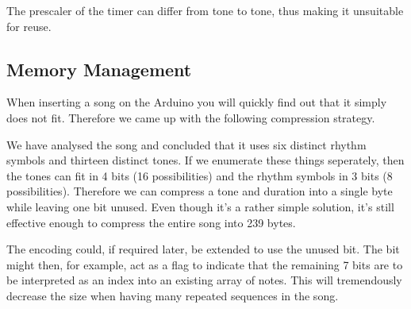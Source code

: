 The prescaler of the timer can differ from tone to tone, thus making it
unsuitable for reuse.

\newpage
\subsection{Memory Management}
\label{sec:music-memory}
When inserting a song on the Arduino you will quickly find out that it
simply does not fit. Therefore we came up with the following compression
strategy.

We have analysed the song and concluded that it uses six distinct rhythm
symbols and thirteen distinct tones. If we enumerate these things
seperately, then the tones can fit in 4 bits (16 possibilities) and the rhythm
symbols in 3 bits (8 possibilities). Therefore we can compress a tone and
duration into a single byte while leaving one bit unused. Even though it's
a rather simple solution, it's still effective enough to compress the entire
song into 239 bytes.


The encoding could, if required later, be extended to use the unused bit.
The bit might then, for example, act as a flag to indicate that the remaining 7
bits are to be interpreted as an index into an existing array of notes. This
will tremendously decrease the size when having many repeated sequences in
the song.
